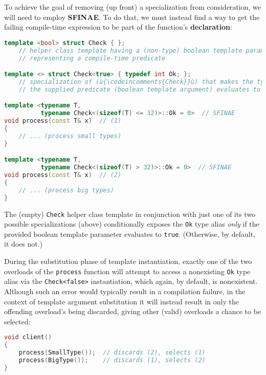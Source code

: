 To achieve the goal of removing (up
front) a specialization from consideration, we will need to employ
\textbf{SFINAE}. To do that, we must instead find a way to get the
failing compile-time expression to be part of the function's
\textbf{declaration}:

\begin{lstlisting}[language=C++]
template <bool> struct Check { };
    // helper class template having a (non-type) boolean template parameter
    // representing a compile-time predicate

template <> struct Check<true> { typedef int Ok; };
    // specialization of (ù{\codeincomments{Check}}ù) that makes the type (ù{\codeincomments{Ok}}ù) manifest *only* if
    // the supplied predicate (boolean template argument) evaluates to (ù{\codeincomments{true}}ù)

template <typename T,
          typename Check<(sizeof(T) <= 32)>::Ok = 0>  // SFINAE
void process(const T& x)  // (1)
{
    // ... (process small types)
}

template <typename T,
          typename Check<(sizeof(T) > 32)>::Ok = 0>  // SFINAE
void process(const T& x)  // (2)
{
    // ... (process big types)
}
\end{lstlisting}
    
\noindent The (empty) \texttt{Check} helper class template in conjunction with
just one of its two possible specializations (above) conditionally
exposes the \texttt{Ok} type alias \emph{only} if the provided boolean
template parameter evaluates to \texttt{true}. (Otherwise, by default, it
does not.) 

During the substitution phase of template instantiation,
exactly one of the two overloads of the \texttt{process} function will
attempt to access a nonexisting \texttt{Ok} type alias via the
\texttt{Check<false>} instantiation, which again, by default, is
nonexistent. Although such an error would typically result in a
compilation failure, in the context of template argument substitution it
will instead result in only the offending overload's being discarded,
giving other (valid) overloads a chance to be selected:

\begin{lstlisting}[language=C++]
void client()
{
    process(SmallType());  // discards (2), selects (1)
    process(BigType());    // discards (1), selects (2)
}
\end{lstlisting}
    
